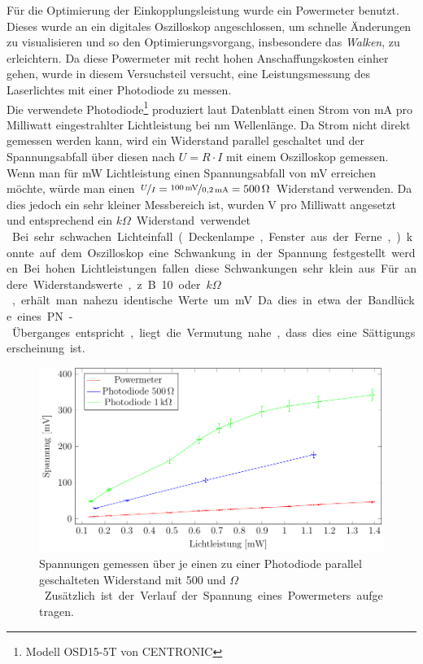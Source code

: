 
Für die Optimierung der Einkopplungsleistung wurde ein Powermeter benutzt. Dieses wurde an ein digitales Oszilloskop angeschlossen, um schnelle Änderungen zu visualisieren und so den Optimierungsvorgang, insbesondere das \textit{Walken}, zu erleichtern. Da diese Powermeter mit recht hohen Anschaffungskosten einher gehen, wurde in diesem Versuchsteil versucht, eine Leistungsmessung des Laserlichtes mit einer Photodiode zu messen.\\

Die verwendete Photodiode\footnote{Modell OSD15-5T von CENTRONIC\cite{farnell.com_osd15-5t_????}} produziert laut Datenblatt einen Strom von \unit[0,18-0,21]{mA} pro Milliwatt eingestrahlter Lichtleistung bei \unit[436]{nm} Wellenlänge. Da Strom nicht direkt gemessen werden kann, wird ein Widerstand parallel geschaltet und der Spannungsabfall über diesen nach $U=R\cdot I$ mit einem Oszilloskop gemessen. Wenn man für \unit[1]{mW} Lichtleistung einen Spannungsabfall von \unit[100]{mV} erreichen möchte, würde man einen $\nicefrac{U}{I}=\nicefrac{\unit[100]{mV}}{\unit[0,2]{mA}}=\unit[500]{\Omega}$ Widerstand verwenden. Da dies jedoch ein sehr kleiner Messbereich ist, wurden \unit[4]{V} pro Milliwatt angesetzt und entsprechend ein \unit[20]{$k\Omega$} Widerstand verwendet.\\

Bei sehr schwachen Lichteinfall (Deckenlampe, Fenster aus der Ferne, ...) konnte auf dem Oszilloskop eine Schwankung in der Spannung festgestellt werden. Bei hohen Lichtleistungen fallen diese Schwankungen sehr klein aus. Für andere Widerstandswerte, z.B. 10 oder \unit[100]{$k\Omega$}, erhält man nahezu identische Werte um \unit[440]{mV}. Da dies in etwa der Bandlücke eines PN-Überganges entspricht, liegt die Vermutung nahe, dass dies eine Sättigungserscheinung ist.

\begin{figure}[ht]
	\centering
	\includegraphics[width=1\linewidth]{graphs/fotodiode/diode.pdf}
	\caption[Vermessung einer Photodiode]{
		Spannungen gemessen über je einen zu einer Photodiode parallel geschalteten Widerstand mit 500 und \unit[1000]{$\Omega$}. Zusätzlich ist der Verlauf der Spannung eines Powermeters aufgetragen.
	}
	\label{fig:photodiode}
\end{figure}

